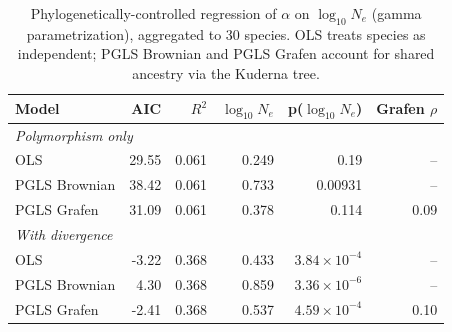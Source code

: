 \begin{table}[H]
\centering
\begin{tabular}{lrrrrr}
\toprule
Model & AIC & $R^2$ & $\log_{10}N_e$ & p($\log_{10}N_e$) & Grafen $\rho$ \\
\midrule
\multicolumn{6}{l}{\emph{Polymorphism only}} \\
OLS & 29.55 & 0.061 & 0.249 & 0.19 & --
\\
PGLS Brownian & 38.42 & 0.061 & 0.733 & 0.00931 & --
\\
PGLS Grafen & 31.09 & 0.061 & 0.378 & 0.114 & 0.09
\\
\midrule
\multicolumn{6}{l}{\emph{With divergence}} \\
OLS & -3.22 & 0.368 & 0.433 & $3.84\times10^{-4}$ & --
\\
PGLS Brownian & 4.30 & 0.368 & 0.859 & $3.36\times10^{-6}$ & --
\\
PGLS Grafen & -2.41 & 0.368 & 0.537 & $4.59\times10^{-4}$ & 0.10
\\
\bottomrule
\end{tabular}
\caption{Phylogenetically-controlled regression of $\alpha$ on $\log_{10}N_e$ (gamma parametrization), aggregated to 30 species. OLS treats species as independent; PGLS Brownian and PGLS Grafen account for shared ancestry via the Kuderna tree.}
\label{tab:divergence_pgls_gamma}
\end{table}

